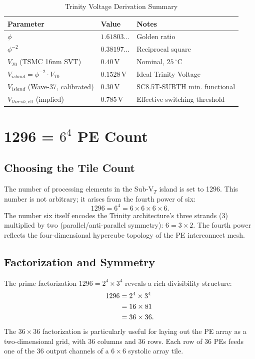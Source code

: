 \begin{table}[htbp]
\centering
\caption{Trinity Voltage Derivation Summary}
\label{tab:trinity_voltage}
\begin{tabular}{lll}
\hline
Parameter & Value & Notes \\
\hline
$\phi$ & $1.61803\ldots$ & Golden ratio \\
$\phi^{-2}$ & $0.38197\ldots$ & Reciprocal square \\
$V_{T0}$ (TSMC 16nm SVT) & $0.40\,\text{V}$ & Nominal, $25\,^\circ\text{C}$ \\
$V_{island} = \phi^{-2} \cdot V_{T0}$ & $0.1528\,\text{V}$ & Ideal Trinity Voltage \\
$V_{island}$ (Wave-37, calibrated) & $0.30\,\text{V}$ & SC8.5T-SUBTH min. functional \\
$V_{thresh,\text{eff}}$ (implied) & $0.785\,\text{V}$ & Effective switching threshold \\
\hline
\end{tabular}
\end{table}

\section{1296 = $6^4$ PE Count}
\label{sec:pe_count}

\subsection{Choosing the Tile Count}

The number of processing elements in the Sub-V$_T$ island is set to 1296.  This number is
not arbitrary; it arises from the fourth power of six:
\[
  1296 = 6^4 = 6 \times 6 \times 6 \times 6.
\]
The number six itself encodes the Trinity architecture's three strands (3) multiplied by two
(parallel/anti-parallel symmetry): $6 = 3 \times 2$.  The fourth power reflects the
four-dimensional hypercube topology of the PE interconnect mesh.

\subsection{Factorization and Symmetry}

The prime factorization $1296 = 2^4 \times 3^4$ reveals a rich divisibility structure:
\begin{align}
  1296 &= 2^4 \times 3^4 \notag \\
       &= 16 \times 81 \notag \\
       &= 36 \times 36. \notag
\end{align}
The $36 \times 36$ factorization is particularly useful for laying out the PE array as a
two-dimensional grid, with 36 columns and 36 rows.  Each row of 36 PEs feeds one of the 36
output channels of a $6 \times 6$ systolic array tile.

